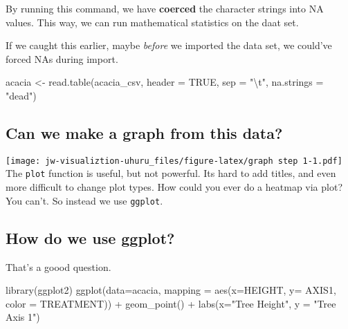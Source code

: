 \documentclass[
]{article}
\newenvironment{Shaded}{\begin{snugshade}}{\end{snugshade}}
\newcommand{\AttributeTok}[1]{\textcolor[rgb]{0.77,0.63,0.00}{#1}}
\newcommand{\ConstantTok}[1]{\textcolor[rgb]{0.00,0.00,0.00}{#1}}
\newcommand{\FunctionTok}[1]{\textcolor[rgb]{0.00,0.00,0.00}{#1}}
\newcommand{\NormalTok}[1]{#1}
\newcommand{\OtherTok}[1]{\textcolor[rgb]{0.56,0.35,0.01}{#1}}
\newcommand{\SpecialCharTok}[1]{\textcolor[rgb]{0.00,0.00,0.00}{#1}}
\newcommand{\StringTok}[1]{\textcolor[rgb]{0.31,0.60,0.02}{#1}}
\begin{document}
By running this command, we have \textbf{coerced} the character strings
into NA values. This way, we can run mathematical statistics on the daat
set.

If we caught this earlier, maybe \emph{before} we imported the data set,
we could've forced NAs during import.

\begin{Shaded}
\begin{Highlighting}[]
\NormalTok{acacia }\OtherTok{\textless{}{-}} \FunctionTok{read.table}\NormalTok{(acacia\_csv, }\AttributeTok{header =} \ConstantTok{TRUE}\NormalTok{, }\AttributeTok{sep =} \StringTok{"}\SpecialCharTok{\textbackslash{}t}\StringTok{"}\NormalTok{, }\AttributeTok{na.strings =} \StringTok{"dead"}\NormalTok{)}
\end{Highlighting}
\end{Shaded}

\hypertarget{can-we-make-a-graph-from-this-data}{%
\subsection{Can we make a graph from this
data?}\label{can-we-make-a-graph-from-this-data}}

\begin{Shaded}
\end{Shaded}

\texttt{[image: jw-visualiztion-uhuru\_files/figure-latex/graph step 1-1.pdf]}
The \texttt{plot} function is useful, but not powerful. Its hard to add
titles, and even more difficult to change plot types. How could you ever
do a heatmap via plot? You can't. So instead we use \texttt{ggplot}.

\hypertarget{how-do-we-use-ggplot}{%
\subsection{How do we use ggplot?}\label{how-do-we-use-ggplot}}

That's a goood question.

\begin{Shaded}
\begin{Highlighting}[]
\FunctionTok{library}\NormalTok{(ggplot2)}
\FunctionTok{ggplot}\NormalTok{(}\AttributeTok{data=}\NormalTok{acacia, }\AttributeTok{mapping =} \FunctionTok{aes}\NormalTok{(}\AttributeTok{x=}\NormalTok{HEIGHT, }\AttributeTok{y=}\NormalTok{ AXIS1, }\AttributeTok{color =}\NormalTok{ TREATMENT)) }\SpecialCharTok{+}
  \FunctionTok{geom\_point}\NormalTok{() }\SpecialCharTok{+}
  \FunctionTok{labs}\NormalTok{(}\AttributeTok{x=}\StringTok{"Tree Height"}\NormalTok{, }\AttributeTok{y =} \StringTok{"Tree Axis 1"}\NormalTok{)}
\end{Highlighting}
\end{Shaded}
\end{document}
